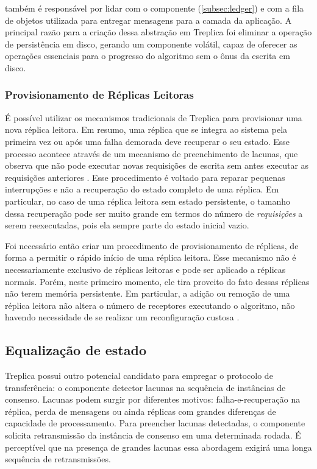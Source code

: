  também é responsável por lidar com o componente
 (\autoref{subsec:ledger}) e com a fila de objetos utilizada
para entregar mensagens para a camada da aplicação. A principal razão para a criação dessa
abstração em Treplica foi eliminar a operação de persistência em disco, gerando um
componente volátil, capaz de oferecer as operações essenciais para o progresso do
algoritmo sem o ônus da escrita em disco.

\subsubsection{Provisionamento de Réplicas Leitoras}

É possível utilizar os mecanismos tradicionais de Treplica para provisionar uma nova
réplica leitora. Em resumo, uma réplica que se integra ao sistema pela primeira vez ou
após uma falha demorada deve recuperar o seu estado. Esse processo acontece através de um
mecanismo de preenchimento de lacunas, que observa que não pode executar novas requisições
de escrita sem antes executar as requisições anteriores \cite{vieira-tr10b}. Esse
procedimento é voltado para reparar pequenas interrupções e não a recuperação do estado
completo de uma réplica. Em particular, no caso de uma réplica leitora sem estado
persistente, o tamanho dessa recuperação pode ser muito grande em termos do número de
\emph{requisições} a serem reexecutadas, pois ela sempre parte do estado inicial vazio.

Foi necessário então criar um procedimento de provisionamento de réplicas, de forma a
permitir o rápido início de uma réplica leitora. Esse mecanismo não é necessariamente
exclusivo de réplicas leitoras e pode ser aplicado a réplicas normais. Porém, neste
primeiro momento, ele tira proveito do fato dessas réplicas não terem memória persistente.
Em particular, a adição ou remoção de uma réplica leitora não altera o número de
receptores executando o algoritmo, não havendo necessidade de se realizar um
reconfiguração custosa \cite{lamport10}.

\subsection{Equalização de estado}

Treplica possui outro potencial candidato para empregar o protocolo de transferência: o
componente detector lacunas na sequência de instâncias de consenso. Lacunas podem surgir
por diferentes motivos: falha-e-recuperação na réplica, perda de mensagens ou ainda
réplicas com grandes diferenças de capacidade de processamento. Para preencher lacunas
detectadas, o componente solicita retransmissão da instância de consenso em uma
determinada rodada. É perceptível que na presença de grandes lacunas essa abordagem
exigirá uma longa sequência de retransmissões.


